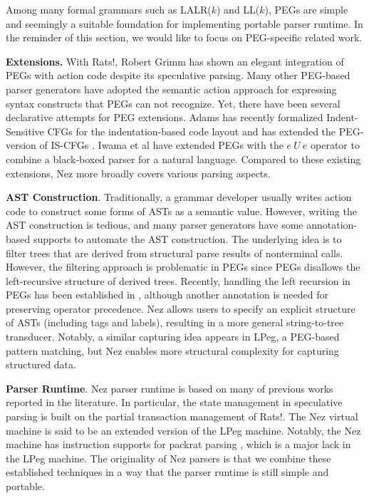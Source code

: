 \documentclass[preprint]{sigplanconf}
\begin{document}
Among many formal grammars such as LALR($k$) and LL($k$), PEGs are simple and seemingly a suitable foundation for implementing portable parser runtime. In the reminder of this section, we would like to focus on PEG-specific related work.

{\bf Extensions.} 
With Rats$!$, Robert Grimm has shown an elegant integration of PEGs with action code despite its speculative parsing\cite{PLDI06_Rats}. Many other PEG-based parser generators\cite{PEGjs,FI07_Mouse,PEGTL} have adopted the semantic action approach for expressing syntax constructs that PEGs can not recognize. Yet, there have been several declarative attempts for PEG extensions.
Adams has recently formalized  Indent-Sensitive CFGs \cite{POPL13_Indentation} for the indentation-based code layout and has extended the PEG-version of IS-CFGs \cite{Haskell14_Indentation}.
Iwama et al have extended PEGs with the $e~U~e$ operator to combine a black-boxed parser for a natural language\cite{ICSE12_PEGs}. Compared to these existing extensions, Nez more broadly covers various parsing aspects.

{\bf AST Construction}. 
Traditionally, a grammar developer usually writes action code to construct some forms of ASTs as a semantic value\cite{LDTA10_ASTConstruction}. However, writing the AST construction is tedious, and many parser generators have some annotation-based supports to automate the AST construction. The underlying idea is to filter trees that are derived from structural parse results of nonterminal calls. However, the filtering approach is problematic in PEGs since PEGs disallows the left-recursive structure of derived trees. Recently, handling the left recursion in PEGs has been established in \cite{SCP14_Left}, although another annotation is needed for preserving operator precedence. 
Nez allows users to specify an explicit structure of ASTs (including tags and labels), resulting in a more general string-to-tree transducer. Notably, a similar capturing idea appears in LPeg\cite{LPeg}, a PEG-based pattern matching, but Nez enables more structural complexity for capturing structured data. 

{\bf Parser Runtime}.
Nez parser runtime is based on many of previous works reported in the literature\cite{PLDI06_Rats,DLS08_LPeg,FI07_Mouse,PRO101}. In particular, the state management in speculative parsing is built on the partial transaction management of Rats$!$.  The Nez virtual machine is said to be an extended version of the LPeg machine. Notably, the Nez machine has instruction supports for packrat parsing \cite{ICFP02_PackratParsing}, which is a major lack in the LPeg machine. The originality of Nez parsers is that we combine these established techniques in a way that the parser runtime is still simple and portable.  
\end{document}
